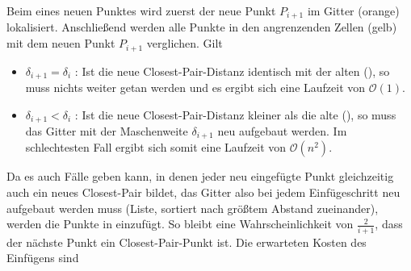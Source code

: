 \documentclass{scrartcl}%
\begin{document}
    \begin{figure}[H]
        \centering
        \begin{table}[H]
            \centering
        \end{table}
    \end{figure}

    Beim  eines neuen Punktes wird zuerst der neue Punkt $P_{i+1}$ im Gitter (orange) lokalisiert.
    Anschließend werden alle Punkte in den angrenzenden Zellen (gelb)
    mit dem neuen Punkt $P_{i+1}$ verglichen. Gilt

    \begin{itemize}
        \item $\delta_{i+1} = \delta_i $ : Ist die neue Closest-Pair-Distanz identisch mit der alten
        (), so muss nichts weiter getan werden
        und es ergibt sich eine Laufzeit von $\mathcal{O}(1)$.
        \item $\delta_{i+1} < \delta_i $ : Ist die neue Closest-Pair-Distanz
        kleiner als die alte (),
        so muss das Gitter mit der Maschenweite $\delta_{i+1}$ neu aufgebaut werden.
        Im schlechtesten Fall ergibt sich somit eine Laufzeit von $\mathcal{O}(n^2)$.
    \end{itemize}

    Da es auch Fälle geben kann, in denen jeder neu eingefügte Punkt gleichzeitig auch ein neues Closest-Pair bildet,
    das Gitter also bei jedem Einfügeschritt neu aufgebaut werden muss (Liste, sortiert nach größtem Abstand zueinander),
    werden die Punkte in  einzufügt.
    So bleibt eine Wahrscheinlichkeit von $\frac{2}{i+1}$, dass der nächste Punkt ein Closest-Pair-Punkt ist.
    Die erwarteten Kosten des Einfügens  sind
\end{document}
